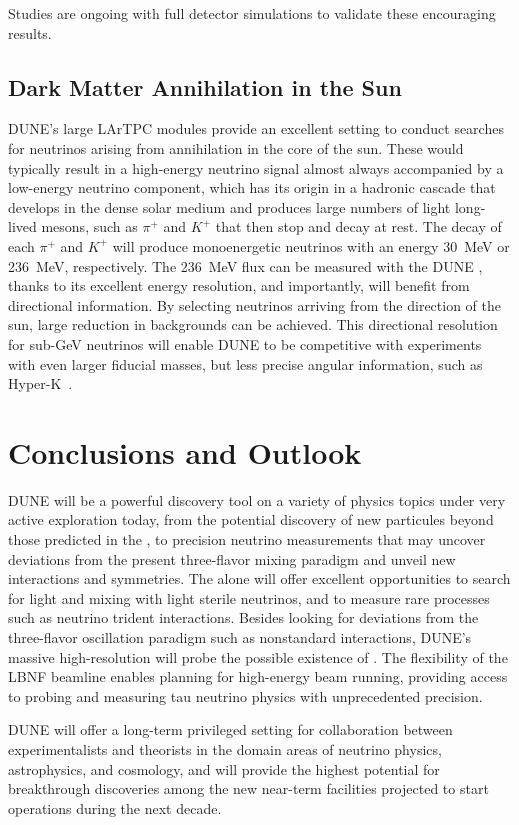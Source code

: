 Studies are ongoing with full detector simulations to validate these 
encouraging results.


\subsection{Dark Matter Annihilation in the Sun}
DUNE's large  LArTPC modules provide an excellent setting to conduct searches for neutrinos arising from  annihilation in the core of the sun. These would typically result in a high-energy neutrino signal almost always accompanied by a low-energy neutrino component, which has its origin in a hadronic cascade that develops in the dense solar medium and produces large numbers of light long-lived mesons, such as $\pi^+$ and $K^+$ that
then stop and decay at rest. The decay of each $\pi^+$ and $K^+$ will produce monoenergetic neutrinos with an energy \SI{30}{MeV} or \SI{236}{MeV}, respectively.
The  \SI{236}{MeV} flux can be measured with the DUNE , thanks to its excellent energy resolution, and importantly, will benefit from directional information. By selecting neutrinos arriving from the direction of the sun, large reduction in backgrounds can be achieved.
This directional resolution for sub-GeV neutrinos will enable DUNE to be competitive with experiments with even larger fiducial masses, but less precise angular information, such as Hyper-K~\cite{ref:DMannihilation}.

\section{Conclusions and Outlook}
DUNE will be a powerful discovery tool on a variety of physics topics under very active exploration today, from the potential discovery of new particules beyond those predicted in the , to precision neutrino measurements that may uncover deviations from the present three-flavor mixing paradigm and unveil new interactions and symmetries.
The  alone will offer excellent opportunities to search for light  and mixing with light sterile neutrinos, and to measure rare processes such as neutrino trident interactions. Besides looking for deviations from the three-flavor oscillation paradigm such as nonstandard interactions, DUNE's massive high-resolution  will probe the possible existence of . The flexibility of the LBNF beamline enables planning for high-energy beam running, providing access to probing and measuring tau neutrino physics with unprecedented precision.

DUNE will offer a long-term privileged setting for collaboration between experimentalists and theorists in the domain areas of neutrino physics, astrophysics, and cosmology, and will provide the highest potential for breakthrough discoveries among the new near-term facilities projected to start operations during the next decade.
